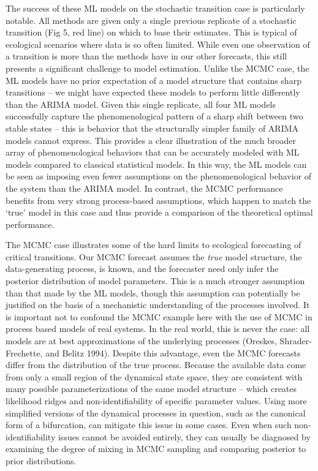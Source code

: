 \documentclass{article}
\begin{document}
The success of these ML models on the stochastic transition case is
particularly notable. All methods are given only a single previous
replicate of a stochastic transition (Fig 5, red line) on which to base
their estimates. This is typical of ecological scenarios where data is
so often limited. While even one observation of a transition is more
than the methods have in our other forecasts, this still presents a
significant challenge to model estimation. Unlike the MCMC case, the ML
models have no prior expectation of a model structure that contains
sharp transitions -- we might have expected these models to perform
little differently than the ARIMA model. Given this single replicate,
all four ML models successfully capture the phenomenological pattern of
a sharp shift between two stable states -- this is behavior that the
structurally simpler family of ARIMA models cannot express. This
provides a clear illustration of the much broader array of
phenomenological behaviors that can be accurately modeled with ML models
compared to classical statistical models. In this way, the ML models can
be seen as imposing even fewer assumptions on the phenomenological
behavior of the system than the ARIMA model. In contrast, the MCMC
performance benefits from very strong process-based assumptions, which
happen to match the `true' model in this case and thus provide a
comparison of the theoretical optimal performance.

The MCMC case illustrates some of the hard limits to ecological
forecasting of critical transitions. Our MCMC forecast assumes the
\emph{true} model structure, the data-generating process, is known, and
the forecaster need only infer the posterior distribution of model
parameters. This is a much stronger assumption than that made by the ML
models, though this assumption can potentially be justified on the basis
of a mechanistic understanding of the processes involved. It is
important not to confound the MCMC example here with the use of MCMC in
process based models of real systems. In the real world, this is never
the case: all models are at best approximations of the underlying
processes (Oreskes, Shrader-Frechette, and Belitz 1994). Despite this
advantage, even the MCMC forecasts differ from the distribution of the
true process. Because the available data come from only a small region
of the dynamical state space, they are consistent with many possible
parameterizations of the same model structure -- which creates
likelihood ridges and non-identifiability of specific parameter values.
Using more simplified versions of the dynamical processes in question,
such as the canonical form of a bifurcation, can mitigate this issue in
some cases. Even when such non-identifiability issues cannot be avoided
entirely, they can usually be diagnosed by examining the degree of
mixing in MCMC sampling and comparing posterior to prior distributions.
\end{document}
